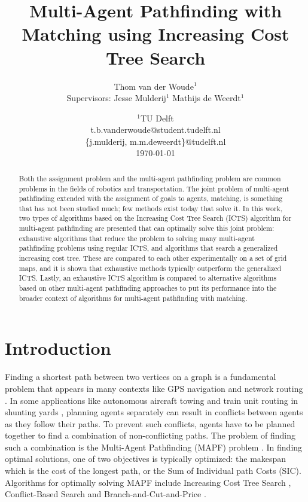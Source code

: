 \documentclass[english]{article}
\begin{document}
	
	\title{Multi-Agent Pathfinding with Matching using Increasing Cost Tree Search}
	\author{
		Thom van der Woude$^1$\\[2ex]
		\normalsize{Supervisors: Jesse Mulderij$^1$ Mathijs de Weerdt$^1$}
	}
	\date{
		$^1$TU Delft\\
		t.b.vanderwoude@student.tudelft.nl\\\{j.mulderij, m.m.deweerdt\}@tudelft.nl\\[2ex]
		\today
	}
	
	\maketitle
	
	\begin{abstract}
		\noindent Both the assignment problem and the multi-agent pathfinding problem are common problems in the fields of robotics and transportation. The joint problem of multi-agent pathfinding extended with the assignment of goals to agents, matching, is something that has not been studied much; few methods exist today that solve it. In this work, two types of algorithms based on the Increasing Cost Tree Search (ICTS) algorithm for multi-agent pathfinding are presented that can optimally solve this joint problem: exhaustive algorithms that reduce the problem to solving many multi-agent pathfinding problems using regular ICTS, and algorithms that search a generalized increasing cost tree. These are compared to each other experimentally on a set of grid maps, and it is shown that exhaustive methods typically outperform the generalized ICTS. Lastly, an exhaustive ICTS algorithm is compared to alternative algorithms based on other multi-agent pathfinding approaches to put its performance into the broader context of algorithms for multi-agent pathfinding with matching.
	\end{abstract}
	
	\section{Introduction}
	Finding a shortest path between two vertices on a graph is a fundamental problem that appears in many contexts like GPS navigation \cite{sturtevant2010} and network routing \cite{broch1998}. In some applications like autonomous aircraft towing \cite{morris2016} and train unit routing in shunting yards \cite{mulderij2020}, planning agents separately can result in conflicts between agents as they follow their paths. To prevent such conflicts, agents have to be planned together to find a combination of non-conflicting paths. The problem of finding such a combination is the Multi-Agent Pathfinding (MAPF) problem \cite{stern2019}. In finding optimal solutions, one of two objectives is typically optimized: the makespan which is the cost of the longest path, or the Sum of Individual path Costs (SIC). Algorithms for optimally solving MAPF include Increasing Cost Tree Search \cite{sharon2013}, Conflict-Based Search \cite{sharon2015} and Branch-and-Cut-and-Price \cite{lam2019}.
	
\end{document}
